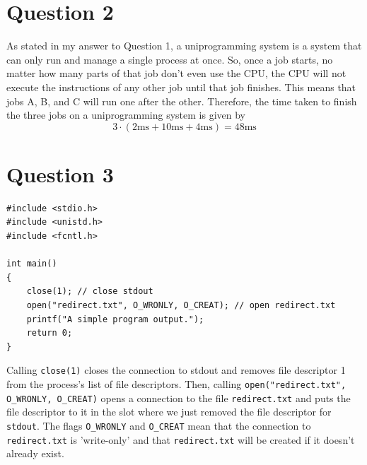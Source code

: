 \documentclass[11pt, letterpaper]{article}
\begin{document}
\newpage

\section*{Question 2}

As stated in my answer to Question 1, a uniprogramming system is a system that can only run and manage a single process at once.  So, once a job starts, no matter how many parts of that job don't even use the CPU, the CPU will not execute the instructions of any other job until that job finishes.  This means that jobs A, B, and C will run one after the other.  Therefore, the time taken to finish the three jobs on a uniprogramming system is given by $$3 \cdot (2\text{ms} + 10\text{ms} + 4\text{ms}) = 48\text{ms}$$

\section*{Question 3}

\begin{verbatim}
#include <stdio.h>
#include <unistd.h>
#include <fcntl.h>

int main()
{
    close(1); // close stdout
    open("redirect.txt", O_WRONLY, O_CREAT); // open redirect.txt
    printf("A simple program output.");
    return 0;
}
\end{verbatim}

Calling \texttt{close(1)} closes the connection to {stdout} and removes file descriptor 1 from the process's list of file descriptors.  Then, calling \texttt{open("redirect.txt", O_WRONLY, O_CREAT)} opens a connection to the file \texttt{redirect.txt} and puts the file descriptor to it in the slot where we just removed the file descriptor for \texttt{stdout}.  The flags \texttt{O_WRONLY} and \texttt{O_CREAT} mean that the connection to \texttt{redirect.txt} is 'write-only' and that \texttt{redirect.txt} will be created if it doesn't already exist.
\end{document}
